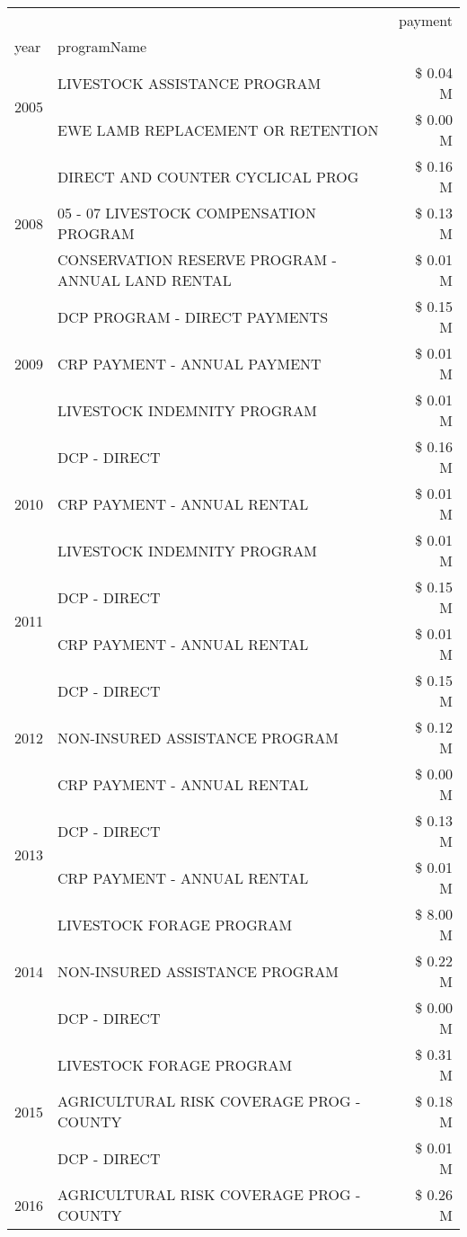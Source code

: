 \begin{tabular}{llr}
\toprule
 &  & payment \\
year & programName &  \\
\midrule
\multirow[t]{2}{*}{2005} & LIVESTOCK ASSISTANCE PROGRAM & \$ 0.04 M \\
 & EWE LAMB REPLACEMENT OR RETENTION & \$ 0.00 M \\
\cline{1-3}
\multirow[t]{3}{*}{2008} & DIRECT AND COUNTER CYCLICAL PROG & \$ 0.16 M \\
 & 05 - 07 LIVESTOCK COMPENSATION PROGRAM & \$ 0.13 M \\
 & CONSERVATION RESERVE PROGRAM - ANNUAL LAND RENTAL & \$ 0.01 M \\
\cline{1-3}
\multirow[t]{3}{*}{2009} & DCP PROGRAM - DIRECT PAYMENTS & \$ 0.15 M \\
 & CRP PAYMENT - ANNUAL PAYMENT & \$ 0.01 M \\
 & LIVESTOCK INDEMNITY PROGRAM & \$ 0.01 M \\
\cline{1-3}
\multirow[t]{3}{*}{2010} & DCP - DIRECT & \$ 0.16 M \\
 & CRP PAYMENT - ANNUAL RENTAL & \$ 0.01 M \\
 & LIVESTOCK INDEMNITY PROGRAM & \$ 0.01 M \\
\cline{1-3}
\multirow[t]{2}{*}{2011} & DCP - DIRECT & \$ 0.15 M \\
 & CRP PAYMENT - ANNUAL RENTAL & \$ 0.01 M \\
\cline{1-3}
\multirow[t]{3}{*}{2012} & DCP - DIRECT & \$ 0.15 M \\
 & NON-INSURED ASSISTANCE PROGRAM & \$ 0.12 M \\
 & CRP PAYMENT - ANNUAL RENTAL & \$ 0.00 M \\
\cline{1-3}
\multirow[t]{2}{*}{2013} & DCP - DIRECT & \$ 0.13 M \\
 & CRP PAYMENT - ANNUAL RENTAL & \$ 0.01 M \\
\cline{1-3}
\multirow[t]{3}{*}{2014} & LIVESTOCK FORAGE PROGRAM & \$ 8.00 M \\
 & NON-INSURED ASSISTANCE PROGRAM & \$ 0.22 M \\
 & DCP - DIRECT & \$ 0.00 M \\
\cline{1-3}
\multirow[t]{3}{*}{2015} & LIVESTOCK FORAGE PROGRAM & \$ 0.31 M \\
 & AGRICULTURAL RISK COVERAGE PROG - COUNTY & \$ 0.18 M \\
 & DCP - DIRECT & \$ 0.01 M \\
\cline{1-3}
\multirow[t]{2}{*}{2016} & AGRICULTURAL RISK COVERAGE PROG - COUNTY & \$ 0.26 M \\

\end{tabular}
